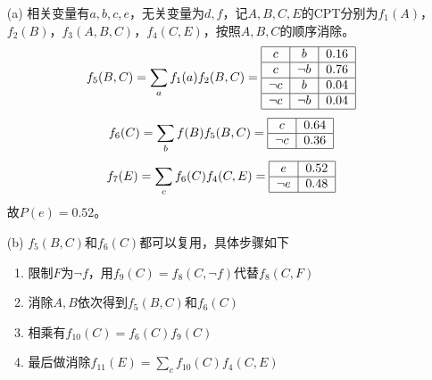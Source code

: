 \documentclass[a4paper, 11pt]{article}
\begin{document}
\begin{answer}
\begin{itemize}
    \item [(a)] 相关变量有$a,b,c,e$，无关变量为$d,f$，记$A,B,C,E$的CPT分别为$f_1(A)$，$f_2(B)$，$f_3(A,B,C)$，$f_4(C,E)$，按照$A,B,C$的顺序消除。
    \[f_5(B,C)=\sum_a f_1(a)f_2(B,C)=\text{\begin{tabular}{|c|c|c|}\hline
        $c$ & $b$ & $0.16$\\\hline
        $c$ & $\lnot b$ & $0.76$\\\hline
        $\lnot c$ & $b$ & $0.04$\\\hline
        $\lnot c$ & $\lnot b$ & $0.04$\\\hline
    \end{tabular}}\]
    \[f_6(C)=\sum_b f(B)f_5(B,C)=\text{\begin{tabular}{|c|c|}\hline
        $c$ & $0.64$\\\hline
        $\lnot c$ & $0.36$\\\hline
    \end{tabular}}\]
    \[f_7(E)=\sum_c f_6(C)f_4(C,E)=\text{\begin{tabular}{|c|c|}\hline
        $e$ & $0.52$\\\hline
        $\lnot e$ & $0.48$\\\hline
    \end{tabular}}\]
    故$P(e)=0.52$。
    \item [(b)] $f_5(B,C)$和$f_6(C)$都可以复用，具体步骤如下
    \begin{enumerate}
        \item 限制$F$为$\lnot f$，用$f_9(C)=f_8(C,\lnot f)$代替$f_8(C,F)$
        \item 消除$A,B$依次得到$f_5(B,C)$和$f_6(C)$
        \item 相乘有$f_{10}(C)=f_6(C)f_9(C)$
        \item 最后做消除$f_{11}(E)=\sum_c f_{10}(C)f_4(C,E)$
    \end{enumerate}
\end{itemize}
\end{answer}
\end{document}
